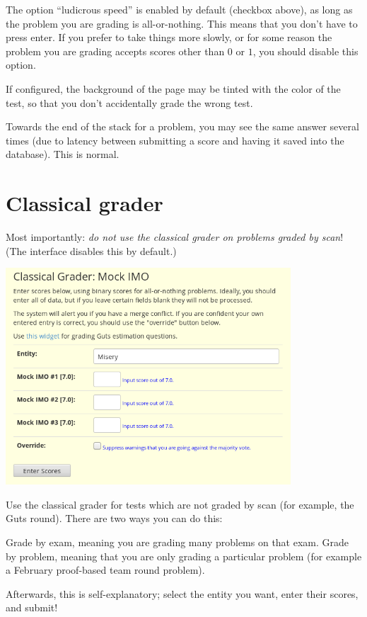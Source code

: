 The option ``ludicrous speed'' is enabled by default (checkbox above),
as long as the problem you are grading is all-or-nothing.
This means that you don't have to press enter.
If you prefer to take things more slowly,
or for some reason the problem you are grading accepts
scores other than $0$ or $1$,
you should disable this option.

If configured, the background of the page may be tinted
with the color of the test, so that you don't accidentally grade
the wrong test.

Towards the end of the stack for a problem,
you may see the same answer several times
(due to latency between submitting a score
and having it saved into the database). This is normal.

\section{Classical grader}
Most importantly:
\emph{do not use the classical grader on problems graded by scan}!
(The interface disables this by default.)

\begin{center}
	\includegraphics[width=0.8\textwidth]{images/classicgrade.png}
\end{center}

Use the classical grader for tests which are not graded by scan
(for example, the Guts round).
There are two ways you can do this:
\begin{itemize}
	\ii Grade by exam, meaning you are grading many problems on that exam.
	\ii Grade by problem, meaning that you are only grading 
	a particular problem (for example a February proof-based team round problem).
\end{itemize}
Afterwards, this is self-explanatory;
select the entity you want, enter their scores, and submit!

